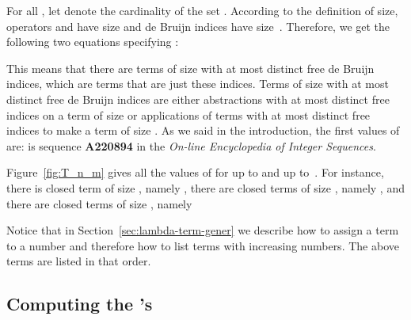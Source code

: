 \documentclass{jfp1}
\begin{document}
For all , let  denote the cardinality of the set
. According to the
definition of size, operators  and  have size  and de Bruijn indices have
size~. Therefore, we get the following two equations specifying :



This means that there are  terms of size  with at most  distinct free de Bruijn indices, which are terms
that are just these indices.   Terms of size  with at most  distinct free de
Bruijn indices are either abstractions with at most  distinct free indices on a term of size
 or applications of terms with at most  distinct free indices to make a term of size .  As we said in the introduction, the  first values of  are:
  is sequence \textbf{A220894} in the \emph{On-line Encyclopedia of Integer Sequences}.
\begin{figure*}
  \centering
  \begin{tiny}
    
  \end{tiny}
  \caption{Values of  for  and  up to  and , respectively}
  \label{fig:T_n_m}
\end{figure*}

Figure~\ref{fig:T_n_m} gives all the values of  for  up to  and  up
to~.  For instance, there is  closed term of size , namely , there are
 closed terms of size , namely ,
and there are  closed terms of size , namely



\begin{center}
  
\end{center}

Notice that in Section~\ref{sec:lambda-term-gener} we describe how to assign a term 
to a number and therefore how to list terms with increasing numbers.  The above terms
are listed in that order.

\subsection{Computing the 's}
\label{sec:actual}
\end{document}
